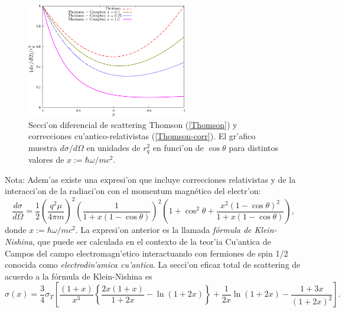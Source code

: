 \begin{figure}[!h]
\centerline{\includegraphics[height=5cm]{fig/fig-Thomson-modelos.pdf}}
 \caption{Secci'on diferencial de scattering Thomson (\ref{Thomson}) y
correcciones cu'antico-relativistas (\ref{Thomson-corr}). El gr'afico muestra
${d\sigma}/{d\Omega}$ en unidades de $r_q^2$ en funci'on de
$\cos\theta$ para distintos valores de $x:={\hbar\omega}/{mc^2}$.}
\label{thomson}
\end{figure}

Nota: Adem'as existe una expresi'on que incluye correcciones relativistas y de la interacci'on de la radiaci'on con el momentum magn\'{e}tico del electr'on:
\begin{equation}
\frac{d\sigma }{d\Omega}=\frac{1}{2}\left(\frac{q^2\mu}{4\pi m}\right)^2
\left(  \frac{1}{1+x\left(  1-\cos
\theta\right)  }\right)  ^{2}\left(  1+\cos^{2}\theta+\frac{x^{2}\left(
1-\cos\theta\right)  ^{2}}{1+x\left(  1-\cos\theta\right)  }\right),
\end{equation}
donde $x:={\hbar\omega}/{mc^{2}}$. La expresi'on anterior es la llamada \textit{fórmula de Klein-Nishina}, que puede ser calculada en el contexto de la teor'ia Cu'antica de Campos del campo electromagn'etico interactuando con fermiones de spin 1/2 conocida como \textit{electrodin'amica cu'antica}.
La secci'on eficaz total de scattering de acuerdo a la fórmula de Klein-Nishina es
\begin{equation}
 \sigma(x)=\frac{3}{4}\sigma_T\left[\frac{(1+x)}{x^3}\left\lbrace\frac{2x(1+x)}{1+2x}-\ln(1+2x)\right\rbrace+\frac{1}{2x}\ln(1+2x)-\frac{1+3x}{(1+2x)^2}\right].
\end{equation}



%
%



